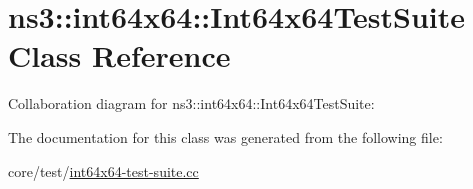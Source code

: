 \hypertarget{classns3_1_1int64x64_1_1Int64x64TestSuite}{}\section{ns3\+:\+:int64x64\+:\+:Int64x64\+Test\+Suite Class Reference}
\label{classns3_1_1int64x64_1_1Int64x64TestSuite}


Collaboration diagram for ns3\+:\+:int64x64\+:\+:Int64x64\+Test\+Suite\+:


The documentation for this class was generated from the following file\+:\begin{DoxyCompactItemize}
\item 
core/test/\hyperlink{int64x64-test-suite_8cc}{int64x64-\/test-\/suite.\+cc}\end{DoxyCompactItemize}

